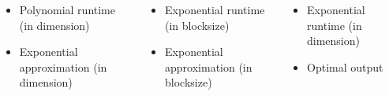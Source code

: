 \documentclass[
aspectratio=169, %
t, %
onlytextwidth, %
10pt, %
]{beamer}
\begin{document}
\begin{frame}
\begin{columns}
\begin{column}{0.33\linewidth}
\begin{tcolorbox}[colback=ICLBlue!5!white,colframe=ICLBlue,title=\textbf{LLL}]
                    \begin{itemize}
                        \item Polynomial runtime (in dimension)
                        \item Exponential approximation (in dimension)
                    \end{itemize}
                \end{tcolorbox}
        \end{column}
        \begin{column}{0.33\linewidth}
                \begin{tcolorbox}[colback=ICLBlue!5!white,colframe=ICLBlue,title=\textbf{BKZ}]
                    \begin{itemize}
                        \item Exponential runtime (in blocksize)
                        \item Exponential approximation (in blocksize)
                    \end{itemize}
                \end{tcolorbox}
        \end{column}
        \begin{column}{0.33\linewidth}
                \begin{tcolorbox}[colback=ICLBlue!5!white,colframe=ICLBlue,title=\textbf{HKZ}]
                    \begin{itemize}
                        \item Exponential runtime (in dimension)
                        \item Optimal output
                    \end{itemize}
                \end{tcolorbox}
        \end{column}
    \end{columns}
\end{frame}

\end{document}
